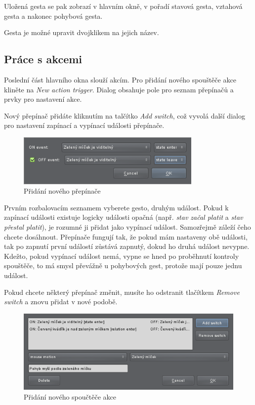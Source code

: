\bigskip
Uložená gesta se pak zobrazí v hlavním okně, v pořadí stavová gesta, vztahová
gesta a nakonec pohybová gesta.

Gesta je možné upravit dvojklikem na jejich název.

\subsection{Práce s akcemi}
Poslední část hlavního okna slouží akcím. Pro přidání nového spouštěče akce
kliněte na \emph{New action trigger}. Dialog obsahuje pole pro seznam
přepínačů a prvky pro nastavení akce.

Nový přepínač přidáte kliknutím na talčítko \emph{Add switch}, což vyvolá
další dialog pro nastavení zapínací a vypínací události přepínače.

\begin{figure}[H]
\centering
\includegraphics[width=0.8\textwidth]{addswitch.png}
\caption{Přidání nového přepínače}
\label{fig:addswitch}
\end{figure}

Prvním rozbalovacím seznamem vyberete gesto, druhým událost. Pokud k zapínací
události existuje logicky události opačná (např. \emph{stav začal platit} a
\emph{stav přestal platit}), je rozumné ji přidat jako vypínací událost.
Samozřejmě záleží čeho chcete dosáhnout. Přepínače fungují tak, že pokud mám
nastaveny obě události, tak po zapnutí první událostí zůstává zapnutý, dokud
ho druhá událost nevypne. Kdežto, pokud vypínací událost nemá, vypne se hned
po proběhnutí kontroly spouštěče, to má smysl převážně u pohybových gest,
protože mají pouze jednu událost.

Pokud chcete některý přepínač změnit, musíte ho odstranit tlačítkem
\emph{Remove switch} a znovu přidat v nové podobě.

\begin{figure}[H]
\centering
\includegraphics[width=1.1\textwidth]{newactiontrigger.png}
\caption{Přidání nového spoučtěče akce}
\label{fig:newactiontrigger}
\end{figure}

